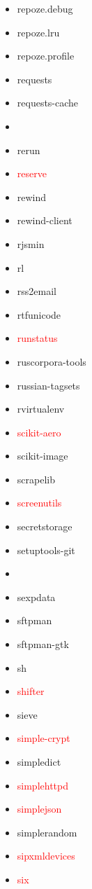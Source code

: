 \documentclass{l4proj}
\begin{document}
\begin{appendices}
{}%
\clearpage
\noindent\parbox[t]{0.32\textwidth}{\raggedright%
\begin{itemize}
\item repoze.debug
\item repoze.lru
\item repoze.profile
\item requests
\item requests-cache
\item\textcolor{red}{}
\item rerun
\item\textcolor{red}{reserve}
\item rewind
\item rewind-client
\item rjsmin
\item rl
\item rss2email
\item rtfunicode
\item\textcolor{red}{runstatus}
\item ruscorpora-tools
\item russian-tagsets
\item rvirtualenv
\item\textcolor{red}{scikit-aero}
\item scikit-image
\item scrapelib
\item\textcolor{red}{screenutils}
\item secretstorage
\item setuptools-git
\item {}
\item sexpdata
\item sftpman
\end{itemize}
}%
\noindent\parbox[t]{0.32\textwidth}{\raggedright%
\begin{itemize}
\item sftpman-gtk
\item sh
\item\textcolor{red}{shifter}
\item sieve
\item\textcolor{red}{simple-crypt}
\item simpledict
\item\textcolor{red}{simplehttpd}
\item\textcolor{red}{simplejson}
\item simplerandom
\item\textcolor{red}{sipxmldevices}
\item\textcolor{red}{six}

\end{itemize}}
\end{appendices}
\end{document}
